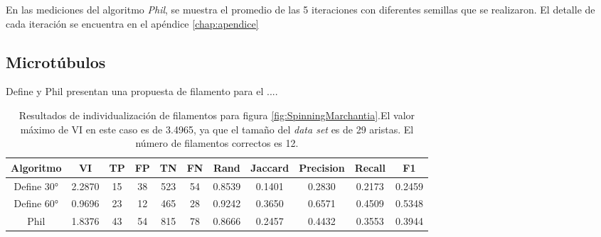 
En las mediciones del algoritmo {\it Phil}, se muestra el promedio de las 5 iteraciones con diferentes semillas que se realizaron. El detalle de cada iteraci\'on se encuentra en el ap\'endice \ref{chap:apendice}

\subsection{Microt\'ubulos}

Define y Phil presentan una propuesta de filamento para el ....

\begin{table}[h]
    \centering
    \begin{tabular}{|c|c|c|c|c|c|c|c|c|c|c|}
    \hline
        Algoritmo & VI & TP & FP &TN &FN & Rand	& Jaccard &	Precision &	Recall &	F1 \\ \hline
        Define 30° & 2.2870  & 15 & 38 & 523 & 54 & 0.8539 & 0.1401 & 0.2830 & 0.2173 & 0.2459\\
        Define 60° & 0.9696 & 23 & 12 & 465 & 28 & 0.9242 & 0.3650 & 0.6571 & 0.4509  & 0.5348 \\ 
        Phil & 1.8376 & 43 & 54 & 815 & 78 & 0.8666 & 0.2457 & 0.4432 & 0.3553 & 0.3944 \\
        \hline
    \end{tabular}
    \caption{Resultados de individualizaci\'on de filamentos para figura \ref{fig:SpinningMarchantia}.El valor m\'aximo de VI en este caso es de 3.4965, ya que el tama\~no del {\it data set} es de 29 aristas. El n\'umero de filamentos correctos es 12.}
    \label{tab:SpinningMarchantiaResults1}
\end{table}

